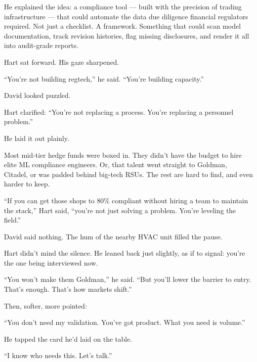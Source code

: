 He explained the idea: a compliance tool --- built with the precision of trading infrastructure --- that could 
automate the data due diligence financial regulators required.  
Not just a checklist. A framework. Something that could scan model documentation, track revision histories, flag 
missing disclosures, and render it all into audit-grade reports.

Hart sat forward. His gaze sharpened.

``You’re not building regtech,'' he said. ``You’re building capacity.''

David looked puzzled.

Hart clarified: ``You’re not replacing a process. You’re replacing a personnel problem.''

He laid it out plainly. 

Most mid-tier hedge funds were boxed in. They didn’t have the budget to hire elite ML compliance engineers. 
Or, that talent went straight to Goldman, Citadel, or was padded behind big-tech RSUs. 
The rest are hard to find, and even harder to keep.

``If you can get those shops to 80\% compliant without hiring a team to maintain the stack,'' Hart said, ``you’re not 
just solving a problem. You’re leveling the field.''

David said nothing. The hum of the nearby HVAC unit filled the pause.

Hart didn’t mind the silence. He leaned back just slightly, as if to signal: you’re the one being interviewed now.

``You won’t make them Goldman,'' he said. ``But you’ll lower the barrier to entry. That’s enough. That’s how markets shift.''

Then, softer, more pointed:

``You don’t need my validation. You’ve got product. What you need is volume.''

He tapped the card he’d laid on the table.

``I know who needs this. Let’s talk.''

\medskip

